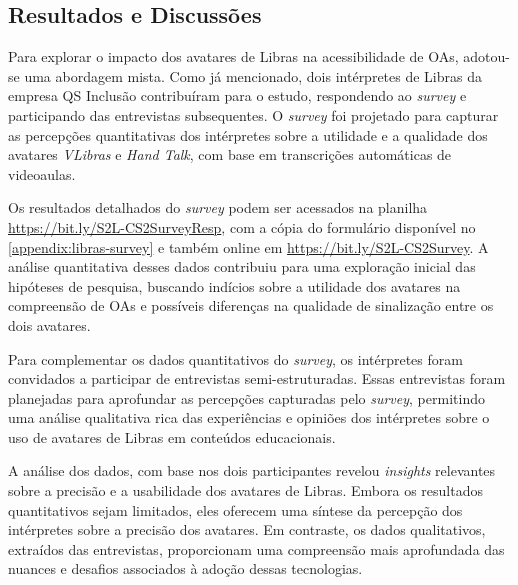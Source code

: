 \subsection{Resultados e Discussões}


Para explorar o impacto dos avatares de Libras na acessibilidade de OAs, adotou-se uma abordagem mista. Como já mencionado, dois intérpretes de Libras da empresa QS Inclusão contribuíram para o estudo, respondendo ao \textit{survey} e participando das entrevistas subsequentes. O \textit{survey} foi projetado para capturar as percepções quantitativas dos intérpretes sobre a utilidade e a qualidade dos avatares \textit{VLibras} e \textit{Hand Talk}, com base em transcrições automáticas de videoaulas.

Os resultados detalhados do \textit{survey} podem ser acessados na planilha \url{https://bit.ly/S2L-CS2SurveyResp}, com a cópia do formulário disponível no \autoref{appendix:libras-survey} e também online em \url{https://bit.ly/S2L-CS2Survey}. A análise quantitativa desses dados contribuiu para uma exploração inicial das hipóteses de pesquisa, buscando indícios sobre a utilidade dos avatares na compreensão de OAs e possíveis diferenças na qualidade de sinalização entre os dois avatares.

Para complementar os dados quantitativos do \textit{survey}, os intérpretes foram convidados a participar de entrevistas semi-estruturadas. Essas entrevistas foram planejadas para aprofundar as percepções capturadas pelo \textit{survey}, permitindo uma análise qualitativa rica das experiências e opiniões dos intérpretes sobre o uso de avatares de Libras em conteúdos educacionais.

A análise dos dados, com base nos dois participantes revelou \textit{insights} relevantes sobre a precisão e a usabilidade dos avatares de Libras. Embora os resultados quantitativos sejam limitados, eles oferecem uma síntese da percepção dos intérpretes sobre a precisão dos avatares. Em contraste, os dados qualitativos, extraídos das entrevistas, proporcionam uma compreensão mais aprofundada das nuances e desafios associados à adoção dessas tecnologias.

